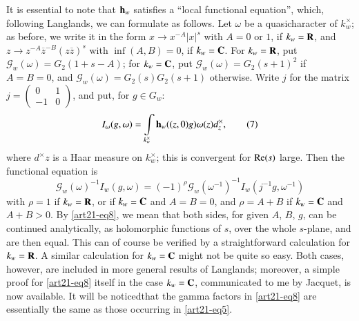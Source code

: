 It is essential to note that $\mathbf{h}_{w}$ satisfies a ``local functional equation'', which, following Langlands, we can formulate as follows. Let $\omega$ be a quasicharacter of $k^{\times}_{w}$; as before, we write it in the form $x\to x^{-A}|x|^{s}$ with $A=0$ or $1$, if $k_{w}=\mathbf{R}$, and $z\to z^{-A}\overline{z}^{-B}(z\overline{z})^{s}$ with $\inf(A,B)=0$, if $k_{w}=\mathbf{C}$. For $k_{w}=\mathbf{R}$, put $\mathscr{G}_{w}(\omega)=G_{2}(1+s-A)$; for $k_{w}=\mathbf{C}$, put $\mathscr{G}_{w}(\omega)=G_{2}(s+1)^{2}$ if $A=B=0$, and $\mathscr{G}_{w}(\omega)=G_{2}(s)G_{2}(s+1)$ otherwise. Write $j$ for the matrix $j=\left(\begin{smallmatrix} 0 & 1\\ -1 & 0\end{smallmatrix}\right)$, and put, for $g\in G_{w}$:
\begin{equation*}
I_{\omega}(g,\omega)=\int\limits_{k^{\times}_{w}}\mathbf{h}_{w}((z,0)g)\omega(z)d^{\times}_{z},\tag{7}\label{art21-eq7}
\end{equation*}
where $d^{\times}z$ is a Haar measure on $k^{\times}_{w}$; this is convergent for $\operatorname{\mathrm{Re}}(s)$ large. Then the functional equation is
\begin{equation*}
\mathscr{G}_{w}(\omega)^{-1}I_{w}(g,\omega)=(-1)^{\rho}\mathscr{G}_{w}(\omega^{-1})^{-1}I_{w}(j^{-1}g,\omega^{-1})\tag{8}\label{art21-eq8}
\end{equation*}
with $\rho=1$ if $k_{w}=\mathbf{R}$, or if $k_{w}=\mathbf{C}$ and $A=B=0$, and $\rho=A+B$ if $k_{w}=\mathbf{C}$ and $A+B>0$. By \eqref{art21-eq8}, we mean that both sides, for given $A$, $B$, $g$, can be continued analytically, as holomorphic functions of $s$, over the whole $s$-plane, and are then equal. This can of course be verified by a straightforward calculation for $k_{w}=\mathbf{R}$. A similar calculation for $k_{w}=\mathbf{C}$ might not be quite so easy. Both cases, however, are included in more general results of Langlands; moreover, a simple proof for \eqref{art21-eq8} itself in the case $k_{w}=\mathbf{C}$, communicated to me by Jacquet, is now available. It will be noticed\pageoriginale that the gamma factors in \eqref{art21-eq8} are essentially the same as those occurring in \eqref{art21-eq5}.

